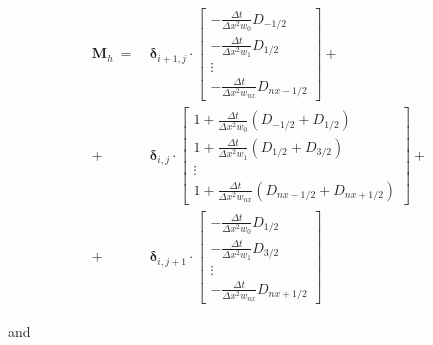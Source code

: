 \documentclass[journal abbreviation, manuscript]{copernicus}
\begin{document}
\begin{equation}
\begin{aligned}
    \boldsymbol{M}_{h}~=~ 
    &\boldsymbol{\delta}_{i+1, j} \cdot
    \begin{bmatrix}
        -\frac{\Delta t}{\Delta x^2 w_0} D_{-1/2} \\
        -\frac{\Delta t}{\Delta x^2 w_1} D_{1/2} \\
        \vdots \\
        -\frac{\Delta t}{\Delta x^2 w_{nx}} D_{nx - 1/2}
    \end{bmatrix}
    + \\
    +~&\boldsymbol{\delta}_{i, j} \cdot
    \begin{bmatrix}
        1 + \frac{\Delta t}{\Delta x^2 w_0} (D_{-1/2} + D_{1/2}) \\
        1 + \frac{\Delta t}{\Delta x^2 w_1} (D_{1/2} + D_{3/2}) \\
        \vdots \\
        1 + \frac{\Delta t}{\Delta x^2 w_{nx}} (D_{nx - 1/2} + D_{nx + 1/2})
    \end{bmatrix}
    + \\
    +~&\boldsymbol{\delta}_{i, j+1} \cdot
    \begin{bmatrix}
        -\frac{\Delta t}{\Delta x^2 w_0} D_{1/2} \\
        -\frac{\Delta t}{\Delta x^2 w_1} D_{3/2} \\
        \vdots \\
        -\frac{\Delta t}{\Delta x^2 w_{nx}} D_{nx + 1/2}
    \end{bmatrix}
\end{aligned}
\end{equation}

\noindent and
\end{document}

